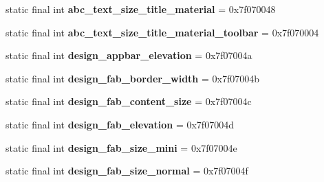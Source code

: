 \begin{DoxyCompactItemize}
\item 
\hypertarget{classandroid_1_1support_1_1design_1_1_r_1_1dimen_abbfc491717374b99ef03c57688c58ec0}{}static final int {\bfseries abc\+\_\+text\+\_\+size\+\_\+title\+\_\+material} = 0x7f070048\label{classandroid_1_1support_1_1design_1_1_r_1_1dimen_abbfc491717374b99ef03c57688c58ec0}

\item 
\hypertarget{classandroid_1_1support_1_1design_1_1_r_1_1dimen_a7f3928a1b96bdd9950713ed0212b419a}{}static final int {\bfseries abc\+\_\+text\+\_\+size\+\_\+title\+\_\+material\+\_\+toolbar} = 0x7f070004\label{classandroid_1_1support_1_1design_1_1_r_1_1dimen_a7f3928a1b96bdd9950713ed0212b419a}

\item 
\hypertarget{classandroid_1_1support_1_1design_1_1_r_1_1dimen_ad02702f8e442d5ce2161992d960183a4}{}static final int {\bfseries design\+\_\+appbar\+\_\+elevation} = 0x7f07004a\label{classandroid_1_1support_1_1design_1_1_r_1_1dimen_ad02702f8e442d5ce2161992d960183a4}

\item 
\hypertarget{classandroid_1_1support_1_1design_1_1_r_1_1dimen_af4f3a9ee873d7757d2dd0be1c2cadf4b}{}static final int {\bfseries design\+\_\+fab\+\_\+border\+\_\+width} = 0x7f07004b\label{classandroid_1_1support_1_1design_1_1_r_1_1dimen_af4f3a9ee873d7757d2dd0be1c2cadf4b}

\item 
\hypertarget{classandroid_1_1support_1_1design_1_1_r_1_1dimen_a640034d9a7862b244c921bc9d8d01889}{}static final int {\bfseries design\+\_\+fab\+\_\+content\+\_\+size} = 0x7f07004c\label{classandroid_1_1support_1_1design_1_1_r_1_1dimen_a640034d9a7862b244c921bc9d8d01889}

\item 
\hypertarget{classandroid_1_1support_1_1design_1_1_r_1_1dimen_a6fe7a893bf5c66341ebde39a58bdcf97}{}static final int {\bfseries design\+\_\+fab\+\_\+elevation} = 0x7f07004d\label{classandroid_1_1support_1_1design_1_1_r_1_1dimen_a6fe7a893bf5c66341ebde39a58bdcf97}

\item 
\hypertarget{classandroid_1_1support_1_1design_1_1_r_1_1dimen_ad2f1e3630649a6bf663595a91a73bb75}{}static final int {\bfseries design\+\_\+fab\+\_\+size\+\_\+mini} = 0x7f07004e\label{classandroid_1_1support_1_1design_1_1_r_1_1dimen_ad2f1e3630649a6bf663595a91a73bb75}

\item 
\hypertarget{classandroid_1_1support_1_1design_1_1_r_1_1dimen_a1149e0b937576ec45f347e32bd7c0995}{}static final int {\bfseries design\+\_\+fab\+\_\+size\+\_\+normal} = 0x7f07004f\label{classandroid_1_1support_1_1design_1_1_r_1_1dimen_a1149e0b937576ec45f347e32bd7c0995}


\end{DoxyCompactItemize}
